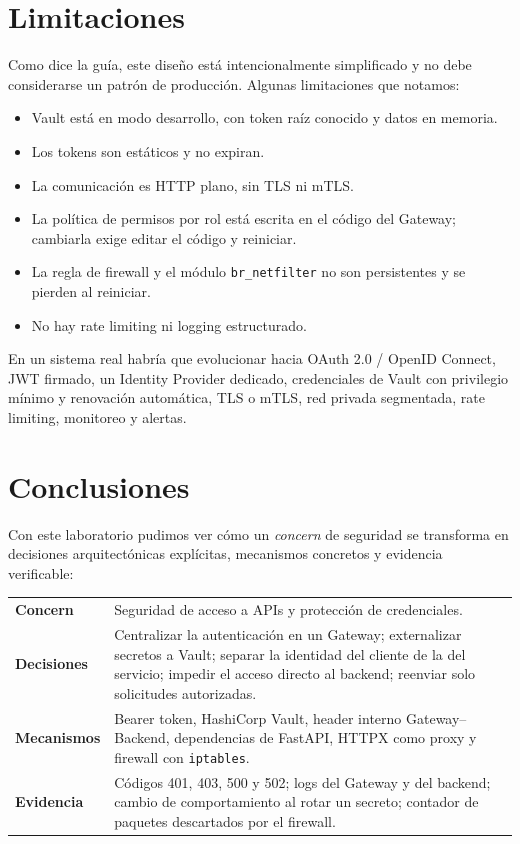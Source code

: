 \documentclass[11pt,a4paper]{article}
\begin{document}
\section{Limitaciones}

Como dice la guía, este diseño está intencionalmente simplificado y no debe considerarse un patrón de producción. Algunas limitaciones que notamos:

\begin{itemize}[noitemsep]
  \item Vault está en modo desarrollo, con token raíz conocido y datos en memoria.
  \item Los tokens son estáticos y no expiran.
  \item La comunicación es HTTP plano, sin TLS ni mTLS.
  \item La política de permisos por rol está escrita en el código del Gateway; cambiarla exige editar el código y reiniciar.
  \item La regla de firewall y el módulo \texttt{br\_netfilter} no son persistentes y se pierden al reiniciar.
  \item No hay rate limiting ni logging estructurado.
\end{itemize}

En un sistema real habría que evolucionar hacia OAuth 2.0 / OpenID Connect, JWT firmado, un Identity Provider dedicado, credenciales de Vault con privilegio mínimo y renovación automática, TLS o mTLS, red privada segmentada, rate limiting, monitoreo y alertas.

\section{Conclusiones}

Con este laboratorio pudimos ver cómo un \textit{concern} de seguridad se transforma en decisiones arquitectónicas explícitas, mecanismos concretos y evidencia verificable:

\begin{center}
\small
\begin{tabular}{@{}p{2.6cm}p{11cm}@{}}
\toprule
\textbf{Concern} & Seguridad de acceso a APIs y protección de credenciales. \\
\textbf{Decisiones} & Centralizar la autenticación en un Gateway; externalizar secretos a Vault; separar la identidad del cliente de la del servicio; impedir el acceso directo al backend; reenviar solo solicitudes autorizadas. \\
\textbf{Mecanismos} & Bearer token, HashiCorp Vault, header interno Gateway--Backend, dependencias de FastAPI, HTTPX como proxy y firewall con \texttt{iptables}. \\
\textbf{Evidencia} & Códigos 401, 403, 500 y 502; logs del Gateway y del backend; cambio de comportamiento al rotar un secreto; contador de paquetes descartados por el firewall. \\
\bottomrule
\end{tabular}
\end{center}
\end{document}
